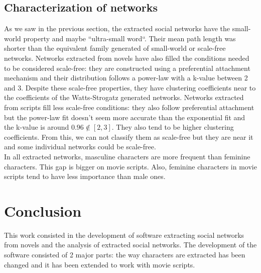 \documentclass[a4paper, 12pt]{report}
\begin{document}
\section{Characterization of networks}
\label{char}

As we saw in the previous section, the extracted social networks have the small-world property and maybe ``ultra-small word``. Their mean path length was shorter than the equivalent family generated of small-world or scale-free networks. Networks extracted from novels have also filled the conditions needed to be considered scale-free: they are constructed using a preferential attachment mechanism and their distribution follows a power-law with a k-value between 2 and 3. Despite these scale-free properties, they have clustering coefficients near to the coefficients of the Watts-Strogatz generated networks. Networks extracted from scripts fill less scale-free conditions: they also follow preferential attachment but the power-law fit doesn't seem more accurate than the exponential fit and the k-value is around $0.96 \notin [2,3]$. They also tend to be higher clustering coefficients. From this, we can not classify them as scale-free but they are near it and some individual networks could be scale-free.\\

In all extracted networks, masculine characters are more frequent than feminine characters. This gap is bigger on movie scripts. Also, feminine characters in movie scripts tend to have less importance than male ones.



\chapter{Conclusion}
This work consisted in the development of software extracting social networks from novels and the analysis of extracted social networks.
The development of the software consisted of 2 major parts: the way characters are extracted has been changed and it has been extended to work with movie scripts.\\
\end{document}
